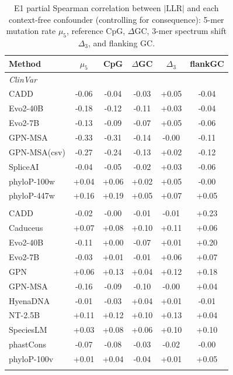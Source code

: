 \documentclass[11pt]{article}
\begin{document}
\begin{table}[h]
\centering
\caption{E1 partial Spearman correlation between $|\mathrm{LLR}|$ and each context-free
confounder (controlling for consequence): 5-mer mutation rate $\mu_5$, reference CpG,
$\Delta$GC, 3-mer spectrum shift $\Delta_3$, and flanking GC.}
\small
\begin{tabular}{lccccc}
\toprule
Method & $\mu_5$ & CpG & $\Delta$GC & $\Delta_3$ & flankGC \\
\midrule
\multicolumn{6}{l}{\emph{ClinVar}}\\
\quad CADD & -0.06 & -0.04 & -0.03 & +0.05 & -0.04 \\
\quad Evo2-40B & -0.18 & -0.12 & -0.11 & +0.03 & -0.04 \\
\quad Evo2-7B & -0.13 & -0.09 & -0.07 & +0.05 & -0.06 \\
\quad GPN-MSA & -0.33 & -0.31 & -0.14 & -0.00 & -0.11 \\
\quad GPN-MSA(csv) & -0.27 & -0.24 & -0.13 & +0.02 & -0.12 \\
\quad SpliceAI & -0.04 & -0.05 & -0.02 & +0.03 & -0.06 \\
\quad phyloP-100w & +0.04 & +0.06 & +0.02 & +0.05 & -0.00 \\
\quad phyloP-447w & +0.16 & +0.19 & +0.05 & +0.07 & +0.05 \\
\addlinespace
\multicolumn{6}{l}{\emph{TraitGym-mendelian}}\\
\quad CADD & -0.02 & -0.00 & -0.01 & -0.01 & +0.23 \\
\quad Caduceus & +0.07 & +0.08 & +0.10 & +0.11 & +0.06 \\
\quad Evo2-40B & -0.11 & +0.00 & -0.07 & +0.01 & +0.20 \\
\quad Evo2-7B & -0.03 & +0.01 & -0.01 & +0.06 & +0.07 \\
\quad GPN & +0.06 & +0.13 & +0.04 & +0.12 & +0.18 \\
\quad GPN-MSA & -0.16 & -0.09 & -0.10 & -0.00 & +0.04 \\
\quad HyenaDNA & -0.01 & -0.03 & +0.04 & +0.01 & -0.01 \\
\quad NT-2.5B & +0.11 & +0.12 & +0.10 & +0.13 & +0.04 \\
\quad SpeciesLM & +0.03 & +0.08 & +0.06 & +0.10 & +0.10 \\
\quad phastCons & -0.07 & -0.08 & -0.03 & -0.02 & -0.00 \\
\quad phyloP-100v & +0.01 & +0.04 & -0.04 & +0.01 & +0.05 \\
\addlinespace
\multicolumn{6}{l}{\emph{TraitGym-complex}}\\

\end{tabular}
\end{table}
\end{document}
